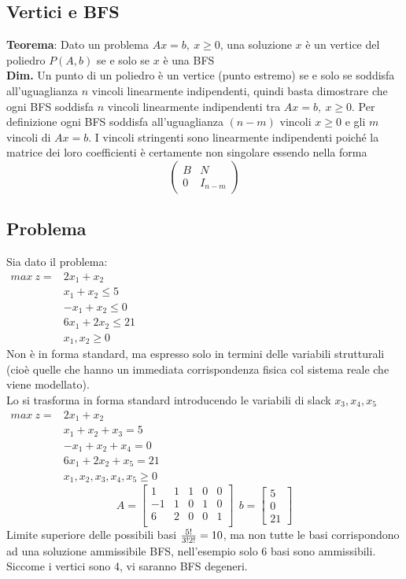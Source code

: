 \documentclass[12pt,a4paper]{article}
\begin{document}
\subsection{Vertici e BFS}
\textbf{Teorema}: Dato un problema $Ax=b, \ x\geq 0$, una soluzione $x$ è un vertice del poliedro $P(A,b)$ se e solo se $x$ è una BFS\\
\textbf{Dim.} Un punto di un poliedro è un vertice (punto estremo) se e solo se soddisfa all’uguaglianza $n$ vincoli linearmente indipendenti, quindi basta dimostrare che ogni BFS soddisfa $n$ vincoli linearmente indipendenti tra $Ax = b,\ x \geq 0$.
Per definizione ogni BFS soddisfa all’uguaglianza $(n-m)$ vincoli $x \geq 0$ e gli $m$ vincoli di $Ax = b$. I vincoli stringenti sono linearmente indipendenti poiché la matrice dei loro coefficienti è certamente non singolare essendo nella forma $$\left(\begin{array}{cc}B&N\\0&I_{n-m}\end{array}\right)$$

\subsection{Problema}
Sia dato il problema:\\
$\begin{array}{rl}
max \ z = & 2x_1+x_2\\
 & x_1+x_2 \leq 5\\
 & -x_1 + x_2 \leq 0\\
 & 6x_1+2x_2 \leq 21\\
 & x_1,x_2 \geq 0
 \end{array}$\\
 Non è in forma standard, ma espresso solo in termini delle variabili strutturali (cioè quelle che hanno un immediata corrispondenza fisica col sistema reale che viene modellato).\\
 Lo si trasforma in forma standard introducendo le variabili di slack $x_3,x_4, x_5$\\
 $\begin{array}{rl}
max \ z =  & 2x_1+x_2\\
 & x_1+x_2 +x_3 = 5\\
 & -x_1 + x_2 + x_4 = 0\\
 & 6x_1+2x_2 + x_5 = 21\\
 & x_1,x_2, x_3, x_4, x_5 \geq 0
 \end{array}$\\
 $$A=\left[\begin{array}{ccccc}
 1&1&1&0&0\\
 -1&1&0&1&0\\
 6&2&0&0&1\\
 \end{array}\right] \ \ b=\left[\begin{array}{c}5\\0\\21\end{array}\right]$$
Limite superiore delle possibili basi ${5! \over 3!2!}=10$, ma non tutte le basi corrispondono ad una soluzione ammissibile BFS, nell'esempio solo 6 basi sono ammissibili.\\
Siccome i vertici sono 4, vi saranno BFS degeneri.\\
\end{document}
